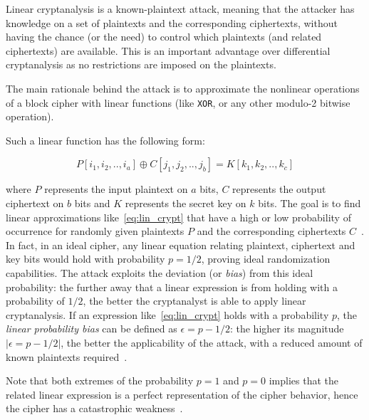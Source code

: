             Linear cryptanalysis is a known-plaintext attack, meaning that the attacker has knowledge on a set of plaintexts and the corresponding ciphertexts, without having the chance (or the need) to control which plaintexts (and related ciphertexts) are available. This is an important advantage over differential cryptanalysis as no restrictions are imposed on the plaintexts.

            The main rationale behind the attack is to approximate the nonlinear operations of a block cipher with linear functions (like \texttt{XOR}, or any other modulo-2 bitwise operation).
            
            Such a linear function has the following form:

            \begin{equation}\label{eq:lin_crypt}
                P[i_1, i_2, .. , i_a] \oplus C[j_1, j_2, .. , j_b] = K[k_1, k_2, .. , k_c]
            \end{equation}

            where $P$ represents the input plaintext on $a$ bits, $C$ represents the output ciphertext on $b$ bits and $K$ represents the secret key on $k$ bits. The goal is to find linear approximations like~\ref{eq:lin_crypt} that have a high or low probability of occurrence for randomly given plaintexts $P$ and the corresponding ciphertexts $C$~\cite{matsui1993linear}. In fact, in an ideal cipher, any linear equation relating plaintext, ciphertext and key bits would hold with probability $p = 1/2$, proving ideal randomization capabilities. The attack exploits the deviation (or \emph{bias}) from this ideal probability: the further away that a linear expression is from holding with a probability of $1/2$, the better the cryptanalyst is able to apply linear cryptanalysis. If an expression like~\ref{eq:lin_crypt} holds with a probability $p$, the \emph{linear probability bias} can be defined as $\epsilon = p - 1/2$: the higher its magnitude $|\epsilon = p - 1/2|$, the better the applicability of the attack, with a reduced amount of known plaintexts required~\cite{heys2002tutorial}.

            Note that both extremes of the probability $p = 1$ and $p = 0$ implies that the related linear expression is a perfect representation of the cipher behavior, hence the cipher has a catastrophic weakness~\cite{heys2002tutorial}.

